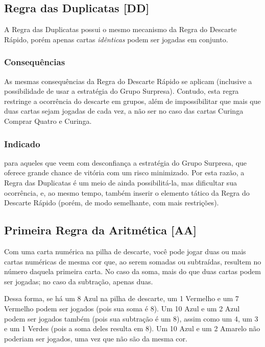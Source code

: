\subsection{Regra das Duplicatas [DD]}

\label{duplicatas}

A Regra das Duplicatas possui o mesmo mecanismo da Regra do Descarte Rápido, porém apenas cartas \emph{idênticas} podem ser jogadas em conjunto.

\subsubsection{Consequências}

As mesmas consequências da Regra do Descarte Rápido se aplicam (inclusive a possibilidade de usar a estratégia do Grupo Surpresa). Contudo, esta regra restringe a ocorrência do descarte em grupos, além de impossibilitar que mais que duas cartas sejam jogadas de cada vez, a não ser no caso das cartas Curinga Comprar Quatro e Curinga.

\subsubsection{Indicado} 

para aqueles que veem com desconfiança a estratégia do Grupo Surpresa, que oferece grande chance de vitória com um risco minimizado. Por esta razão, a Regra das Duplicatas é um meio de ainda possibilitá-la, mas dificultar sua ocorrência, e, ao mesmo tempo, também inserir o elemento tático da Regra do Descarte Rápido (porém, de modo semelhante, com mais restrições).

\subsection{Primeira Regra da Aritmética [AA]}

Com uma carta numérica na pilha de descarte, você pode jogar duas ou mais cartas numéricas de mesma cor que, ao serem somadas ou subtraídas, resultem no número daquela primeira carta. No caso da soma, mais do que duas cartas podem ser jogadas; no caso da subtração, apenas duas.

Dessa forma, se há um 8 Azul na pilha de descarte, um 1 Vermelho e um 7 Vermelho podem ser jogados (pois sua soma é 8). Um 10 Azul e um 2 Azul podem ser jogados também (pois sua subtração é um 8), assim como um 4, um 3 e um 1 Verdes (pois a soma deles resulta em 8). Um 10 Azul e um 2 Amarelo não poderiam ser jogados, uma vez que não são da mesma cor.

